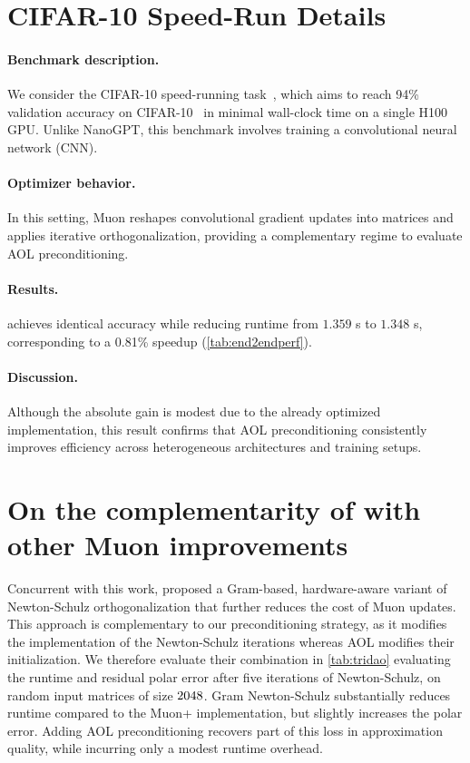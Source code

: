 \section{CIFAR-10 Speed-Run Details}
\label{ap:cifar}

\paragraph{Benchmark description.}
We consider the CIFAR-10 speed-running task~\cite{Jordan2024cifar10airbench}, which aims to reach 94\% validation accuracy on CIFAR-10~\cite{krizhevsky2009learning} in minimal wall-clock time on a single H100 GPU. Unlike NanoGPT, this benchmark involves training a convolutional neural network (CNN).

\paragraph{Optimizer behavior.}
In this setting, Muon reshapes convolutional gradient updates into matrices and applies iterative orthogonalization, providing a complementary regime to evaluate AOL preconditioning.

\paragraph{Results.}
\turbomuon achieves identical accuracy while reducing runtime from $1.359$ s to $1.348$ s, corresponding to a 0.81\% speedup (\cref{tab:end2endperf}).

\paragraph{Discussion.}
Although the absolute gain is modest due to the already optimized implementation, this result confirms that AOL preconditioning consistently improves efficiency across heterogeneous architectures and training setups.

\section{
On the complementarity of  \turbomuon with other Muon improvements
} \label{ap:tridao}

Concurrent with this work, \cite{GramNewtonSchulz} proposed a Gram-based, hardware-aware variant of Newton-Schulz orthogonalization that further reduces the cost of Muon updates. This approach is complementary to our preconditioning strategy, as it modifies the implementation of the Newton-Schulz iterations whereas AOL modifies their initialization. We therefore evaluate their combination in \cref{tab:tridao} evaluating the runtime and residual polar error after five iterations of Newton-Schulz, on random input matrices of size $2048\time 5464$. Gram Newton-Schulz substantially reduces runtime compared to the Muon+ implementation, but slightly increases the polar error. Adding AOL preconditioning recovers part of this loss in approximation quality, while incurring only a modest runtime overhead.

